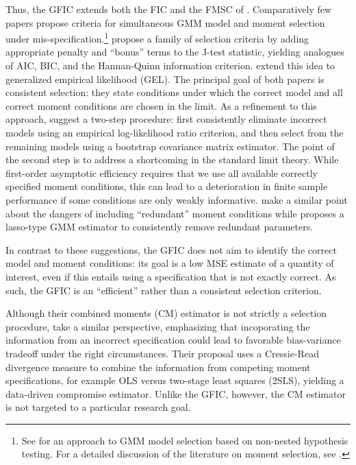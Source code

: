 Thus, the GFIC extends both the FIC and the FMSC of \cite{DiTraglia2016}.
Comparatively few papers propose criteria for simultaneous GMM model and moment selection under mis-specification.\footnote{See \cite{Smith1992} for an approach to GMM model selection based on non-nested hypothesis testing. For a detailed discussion of the literature on moment selection, see \cite{DiTraglia2016}.} \cite{AndrewsLu} propose a family of selection criteria by adding appropriate penalty and ``bonus'' terms to the J-test statistic, yielding analogues of AIC, BIC, and the Hannan-Quinn information criterion.
\cite{HongPrestonShum} extend this idea to generalized empirical likelihood (GEL). 
The principal goal of both papers is consistent selection: they state conditions under which the correct model and all correct moment conditions are chosen in the limit. 
As a refinement to this approach, \cite{LaiSmallLiu} suggest a two-step procedure: first consistently eliminate incorrect models using an empirical log-likelihood ratio criterion, and then select from the remaining models using a bootstrap covariance matrix estimator. 
The point of the second step is to address a shortcoming in the standard limit theory. 
While first-order asymptotic efficiency requires that we use all available correctly specified moment conditions, this can lead to a deterioration in finite sample performance if some conditions are only weakly informative.
\cite{HallPeixe2003} make a similar point about the dangers of including ``redundant'' moment conditions while \cite{Caner2009} proposes a lasso-type GMM estimator to consistently remove redundant parameters.


In contrast to these suggestions, the GFIC does not aim to identify the correct model and moment conditions: its goal is a low MSE estimate of a quantity of interest, even if this entails using a specification that is not exactly correct.  
As such, the GFIC is an ``efficient'' rather than a consistent selection criterion.

Although their combined moments (CM) estimator is not strictly a selection procedure, \cite{JudgeMittelhammer} take a similar perspective, emphasizing that incoporating the information from an incorrect specification could lead to favorable bias-variance tradeoff under the right circumstances. 
Their proposal uses a Cressie-Read divergence measure to combine the information from competing moment specifications, for example OLS versus two-stage least squares (2SLS), yielding a data-driven compromise estimator. 
Unlike the GFIC, however, the CM estimator is not targeted to a particular research goal.

